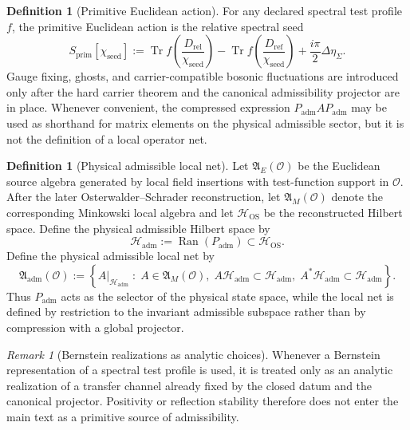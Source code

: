 \documentclass[11pt,a4paper]{article}
\theoremstyle{definition}
\newtheorem{definition}[theorem]{Definition}
\theoremstyle{remark}
\newtheorem*{remark}{Remark}
\DeclareMathOperator{\tr}{Tr}
\newcommand{\chiseed}{\chi_{\mathrm{seed}}}
\newcommand{\Padm}{P_{\mathrm{adm}}}
\begin{document}
\begin{definition}[Primitive Euclidean action]
For any declared spectral test profile $f$, the primitive Euclidean action is the relative
spectral seed
\[
S_{\mathrm{prim}}[\chiseed]
:=
\tr f\!\left(\frac{D_{\mathrm{rel}}}{\chiseed}\right)
-
\tr f\!\left(\frac{D_{\mathrm{ref}}}{\chiseed}\right)
+\frac{i\pi}{2}\Delta\eta_\Sigma.
\]
Gauge fixing, ghosts, and carrier-compatible bosonic fluctuations are introduced only after the
hard carrier theorem and the canonical admissibility projector are in place. Whenever convenient,
the compressed expression $\Padm A\Padm$ may be used as shorthand for matrix elements on the
physical admissible sector, but it is not the definition of a local operator net.
\end{definition}

\begin{definition}[Physical admissible local net]
\label{def:physical-admissible-local-net}
Let $\mathfrak A_E(\mathcal O)$ be the Euclidean source algebra generated by local field insertions
with test-function support in $\mathcal O$. After the later Osterwalder--Schrader reconstruction,
let $\mathfrak A_M(\mathcal O)$ denote the corresponding Minkowski local algebra and let
$\mathcal H_{\mathrm{OS}}$ be the reconstructed Hilbert space. Define the physical admissible
Hilbert space by
\[
\mathcal H_{\mathrm{adm}}:=\operatorname{Ran}(\Padm)\subset \mathcal H_{\mathrm{OS}}.
\]
Define the physical admissible local net by
\[
\mathfrak A_{\mathrm{adm}}(\mathcal O)
:=
\left\{
A|_{\mathcal H_{\mathrm{adm}}}\;:\;
A\in\mathfrak A_M(\mathcal O),\;
A\mathcal H_{\mathrm{adm}}\subset \mathcal H_{\mathrm{adm}},\;
A^\ast\mathcal H_{\mathrm{adm}}\subset \mathcal H_{\mathrm{adm}}
\right\}.
\]
Thus $\Padm$ acts as the selector of the physical state space, while the local net is defined by
restriction to the invariant admissible subspace rather than by compression with a global
projector.
\end{definition}

\begin{remark}[Bernstein realizations as analytic choices]
\label{ass:bernstein-positivity}
Whenever a Bernstein representation of a spectral test profile is used, it is treated only as an
analytic realization of a transfer channel already fixed by the closed datum and the canonical
projector. Positivity or reflection stability therefore does not enter the main text as a
primitive source of admissibility.
\end{remark}
\end{document}
